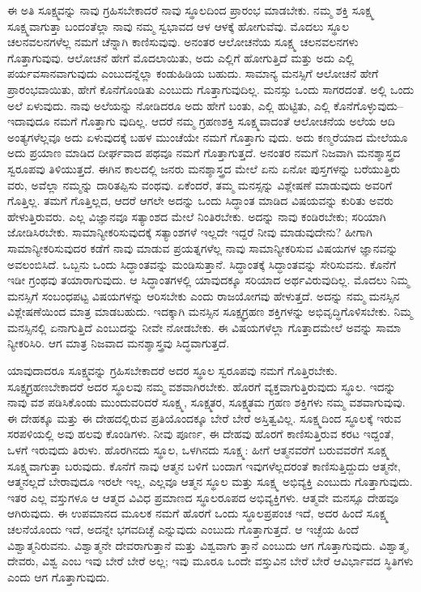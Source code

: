 ಈ ಅತಿ ಸೂಕ್ಷ್ಮವನ್ನು ನಾವು ಗ್ರಹಿಸಬೇಕಾದರೆ ನಾವು ಸ್ಥೂಲದಿಂದ ಪ್ರಾರಂಭ ಮಾಡಬೇಕು. ನಮ್ಮ ಶಕ್ತಿ ಸೂಕ್ಷ್ಮ ಸೂಕ್ಷ್ಮವಾಗುತ್ತಾ ಬಂದಂತೆಲ್ಲಾ ನಾವು ನಮ್ಮ ಸ್ವಭಾವದ ಆಳ ಆಳಕ್ಕೆ ಹೋಗುವೆವು. ಮೊದಲು ಸ್ಥೂಲ ಚಲನವಲನಗಳೆಲ್ಲ ನಮಗೆ ಚೆನ್ನಾಗಿ ಕಾಣಿಸುವುವು. ಅನಂತರ ಆಲೋಚನೆಯ ಸೂಕ್ಷ್ಮ ಚಲನವಲನಗಳು ಗೊತ್ತಾಗುವುವು. ಆಲೋಚನೆ ಹೇಗೆ ಮೊದಲಾಯಿತು, ಅದು ಎಲ್ಲಿಗೆ ಹೋಗುತ್ತಿದೆ ಮತ್ತು ಅದು ಎಲ್ಲಿ ಪರ್ಯವಸಾನವಾಗುವುದು ಎಂಬುದನ್ನೆಲ್ಲಾ ಕಂಡುಹಿಡಿಯ ಬಹುದು. ಸಾಮಾನ್ಯ ಮನಸ್ಸಿಗೆ ಆಲೋಚನೆ ಹೇಗೆ ಪ್ರಾರಂಭವಾಯಿತು, ಹೇಗೆ ಕೊನೆಗೊಂಡಿತು ಎಂಬುದು ಗೊತ್ತಾಗುವುದಿಲ್ಲ. ಮನಸ್ಸು ಒಂದು ಸಾಗರದಂತೆ. ಅಲ್ಲಿ ಒಂದು ಅಲೆ ಏಳುವುದು. ನಾವು ಅಲೆಯನ್ನು ನೋಡಿದರೂ ಅದು ಹೇಗೆ ಬಂತು, ಎಲ್ಲಿ ಹುಟ್ಟಿತು, ಎಲ್ಲಿ ಕೊನೆಗೊಳ್ಳುವುದು–ಇದಾವುದೂ ನಮಗೆ ಗೊತ್ತಾಗು ವುದಿಲ್ಲ. ಆದರೆ ನಮ್ಮ ಗ್ರಹಣಶಕ್ತಿ ಸೂಕ್ಷ್ಮವಾದಂತೆ ಆಲೋಚನೆಯ ಅಲೆಯ ಆದಿ ಅಂತ್ಯಗಳೆಲ್ಲವೂ ಅದು ಏಳುವುದಕ್ಕೆ ಬಹಳ ಮುಂಚೆಯೇ ನಮಗೆ ಗೊತ್ತಾಗು ವುದು. ಅದು ಕಣ್ಮರೆಯಾದ ಮೇಲೆಯೂ ಅದು ಪ್ರಯಾಣ ಮಾಡಿದ ದೀರ್ಘವಾದ ಪಥವೂ ನಮಗೆ ಗೊತ್ತಾಗುತ್ತದೆ. ಅನಂತರ ನಮಗೆ ನಿಜವಾಗಿ ಮನಶ್ಶಾಸ್ತ್ರದ ಸ್ವರೂಪವು ತಿಳಿಯುತ್ತದೆ. ಈಗಿನ ಕಾಲದಲ್ಲಿ ಜನರು ಮನಶ್ಶಾಸ್ತ್ರದ ಮೇಲೆ ಏನು ಏನೋ ಪುಸ್ತಗಳನ್ನು ಬರೆಯುತ್ತಿರು ವರು, ಅವೆಲ್ಲಾ ನಮ್ಮನ್ನು ದಾರಿತಪ್ಪಿಸು ವಂಥವು. ಏಕೆಂದರೆ, ತಮ್ಮ ಮನಸ್ಸನ್ನು ವಿಶ್ಲೇಷಣೆ ಮಾಡುವುದು ಅವರಿಗೆ ಗೊತ್ತಿಲ್ಲ. ತಮಗೆ ಗೊತ್ತಿಲ್ಲದ, ಆದರೆ ಆಗಲೇ ಅದನ್ನು ಒಂದು ಸಿದ್ಧಾಂತ ಮಾಡಿದ ವಿಷಯವನ್ನು ಕುರಿತು ಅವರು ಹೇಳುತ್ತಿರುವರು. ಎಲ್ಲ ವಿಜ್ಞಾನವೂ ಸತ್ಯಾಂಶದ ಮೇಲೆ ನಿಂತಿರಬೇಕು. ಅದನ್ನು ನಾವು ಕಂಡಿರಬೇಕು; ಸರಿಯಾಗಿ ಜೋಡಿಸಿರಬೇಕು. ಸಾಮಾನ್ಯೀಕರಿಸುವುದಕ್ಕೆ ಸತ್ಯಾಂಶಗಳೆ ಇಲ್ಲದೇ ಇದ್ದರೆ ನೀವು ಮಾಡುವುದೇನು? ಹೀಗಾಗಿ ಸಾಮಾನ್ಯೀಕರಿಸುವುದರ ಕಡೆಗೆ ನಾವು ಮಾಡುವ ಪ್ರಯತ್ನಗಳೆಲ್ಲ ನಾವು ಸಾಮಾನ್ಯೀಕರಿಸುವ ವಿಷಯಗಳ ಜ್ಞಾನವನ್ನು ಅವಲಂಬಿಸಿದೆ. ಒಬ್ಬನು ಒಂದು ಸಿದ್ಧಾಂತವನ್ನು ಮಂಡಿಸುತ್ತಾನೆ. ಸಿದ್ಧಾಂತಕ್ಕೆ ಸಿದ್ಧಾಂತವನ್ನು ಸೇರಿಸುವನು. ಕೊನೆಗೆ ಇಡೀ ಗ್ರಂಥವು ತಯಾರಾಗುವುದು. ಆ ಸಿದ್ಧಾಂತಗಳಲ್ಲಿ ಯಾವುದಕ್ಕೂ ಸರಿಯಾದ ಅರ್ಥವಿರುವುದಿಲ್ಲ. ಮೊದಲು ನಿಮ್ಮ ಮನಸ್ಸಿಗೆ ಸಂಬಂಧಪಟ್ಟ ವಿಷಯಗಳನ್ನು ಆರಿಸಬೇಕು ಎಂದು ರಾಜಯೋಗವು ಹೇಳುತ್ತದೆ. ಅದನ್ನು ನಮ್ಮ ಮನಸ್ಸಿನ ವಿಶ್ಲೇಷಣೆಯಿಂದ ಮಾತ್ರ ಮಾಡಬಹುದು. ಇದಕ್ಕಾಗಿ ಮನಸ್ಸಿನ ಸೂಕ್ಷ್ಮಗ್ರಹಣ ಶಕ್ತಿಗಳನ್ನು ಅಭಿವೃದ್ಧಿಗೊಳಿಸಬೇಕು. ನಿಮ್ಮ ಮನಸ್ಸಿನಲ್ಲಿ ಏನಾಗುತ್ತಿದೆ ಎಂಬುದನ್ನು ನೀವೇ ನೋಡಬೇಕು. ಈ ವಿಷಯಗಳೆಲ್ಲಾ ಗೊತ್ತಾದಮೇಲೆ ಅವನ್ನು ಸಾಮಾ ನ್ಯೀಕರಿಸಿರಿ. ಆಗ ಮಾತ್ರ ನಿಜವಾದ ಮನಶ್ಶಾಸ್ತ್ರವು ಸಿದ್ಧವಾಗುತ್ತದೆ.

ಯಾವುದಾದರೂ ಸೂಕ್ಷ್ಮವನ್ನು ಗ್ರಹಿಸಬೇಕಾದರೆ ಅದರ ಸ್ಥೂಲ ಸ್ವರೂಪವು ನಮಗೆ ಗೊತ್ತಿರಬೇಕು. ಸೂಕ್ಷ್ಮಗ್ರಹಣಬೇಕಾದರೆ ಅದರ ಸ್ಥೂಲವು ನಮ್ಮ ವಶವಾಗಿರಬೇಕು. ಹೊರಗೆ ವ್ಯಕ್ತವಾಗುತ್ತಿರುವುದು ಸ್ಥೂಲ. ಇದನ್ನು ನಾವು ವಶ ಪಡಿಸಿಕೊಂಡು ಮುಂದುವರಿದರೆ ಸೂಕ್ಷ್ಮ, ಸೂಕ್ಷ್ಮತರ, ಸೂಕ್ಷ್ಮತಮ ಗ್ರಹಣ ಶಕ್ತಿಗಳು ನಮ್ಮ ವಶವಾಗುವುವು. ಈ ದೇಹಕ್ಕೂ ಮತ್ತು ಈ ದೇಹದಲ್ಲಿರುವ ಪ್ರತಿಯೊಂದಕ್ಕೂ ಬೇರೆ ಬೇರೆ ಅಸ್ತಿತ್ವವಿಲ್ಲ. ಸೂಕ್ಷ್ಮದಿಂದ ಸ್ಥೂಲಕ್ಕೆ ಇರುವ ಸರಪಳಿಯಲ್ಲಿ ಅವು ಹಲವು ಕೊಂಡಿಗಳು. ನೀವು ಪೂರ್ಣ, ಈ ದೇಹವು ಹೊರಗೆ ಕಾಣಿಸುತ್ತಿರುವ ಕರಟ ಇದ್ದಂತೆ, ಒಳಗೆ ಇರುವುದು ತಿರುಳು. ಹೊರಗಿನದು ಸ್ಥೂಲ, ಒಳಗಿನದು ಸೂಕ್ಷ್ಮ: ಹೀಗೆ ಆತ್ಮನವರೆಗೆ ಬರುವವರೆಗೆ ಸೂಕ್ಷ್ಮ ಸೂಕ್ಷ್ಮವಾಗುತ್ತಾ ಬರುವುದು. ಕೊನೆಗೆ ನಾವು ಆತ್ಮನ ಬಳಿಗೆ ಬಂದಾಗ ಇವುಗಳೆಲ್ಲದರಂತೆ ಕಾಣಿಸುತ್ತಿದ್ದುದು ಆತ್ಮನೇ, ಆತ್ಮನಲ್ಲದೆ ಬೇರಾವುದೂ ಇರಲೇ ಇಲ್ಲ, ಎಲ್ಲವೂ ಆತ್ಮನ ಸ್ಥೂಲ ಮತ್ತು ಸೂಕ್ಷ್ಮ ಅಭಿವ್ಯಕ್ತಿ ಎಂಬುದು ಗೊತ್ತಾಗುವುದು. ಇತರ ಎಲ್ಲ ವಸ್ತುಗಳೂ ಆ ಆತ್ಮದ ವಿವಿಧ ಪ್ರಮಾಣದ ಸ್ಥೂಲರೂಪದ ಅಭಿವ್ಯಕ್ತಿಗಳು. ಆತ್ಮವೇ ಮನಸ್ಸೂ ದೇಹವೂ ಆಗಿರುವುದು. ಈ ಉಪಮಾನದ ಮೂಲಕ ನಮಗೆ ಹೊರಗೆ ಒಂದು ಸ್ಥೂಲಪ್ರಪಂಚ ಇದೆ, ಅದರ ಹಿಂದೆ ಸೂಕ್ಷ್ಮ ಚಲನೆಯೊಂದು ಇದೆ, ಅದನ್ನೇ ಭಗವದಿಚ್ಛೆ ಎನ್ನುವುದು ಎಂಬುದು ಗೊತ್ತಾಗುತ್ತದೆ. ಆ ಇಚ್ಛೆಯ ಹಿಂದೆ ವಿಶ್ವಾತ್ಮನಿರುವನು. ವಿಶ್ವಾತ್ಮನೇ ದೇವರಾಗುತ್ತಾನೆ ಮತ್ತು ವಿಶ್ವವಾಗು ತ್ತಾನೆ ಎಂಬುದು ಆಗ ಗೊತ್ತಾಗುವುದು. ವಿಶ್ವಾತ್ಮ, ದೇವರು, ವಿಶ್ವ ಎಂಬ ಇವು ಬೇರೆ ಬೇರೆ ಅಲ್ಲ; ಇವು ಮೂರೂ ಒಂದೇ ವಸ್ತುವಿನ ಬೇರೆ ಬೇರೆ ಆವಿರ್ಭಾವದ ಸ್ಥಿತಿಗಳು ಎಂದು ಆಗ ಗೊತ್ತಾಗುವುದು.

